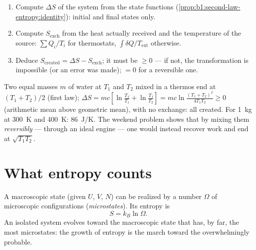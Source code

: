\begin{method}\label{met:b1:second-law-entropy:method}
\begin{enumerate}
  \item Compute $\Delta S$ of the system from the state functions
        (\cref{prop:b1:second-law-entropy:identity}): initial and final
        states only.
  \item Compute $S_{\mathrm{exch}}$ from the heat actually received and the
        temperature of the source: $\sum Q_i/T_i$ for thermostats,
        $\int\delta Q/T_{\mathrm{ext}}$ otherwise.
  \item Deduce $S_{\mathrm{created}} = \Delta S - S_{\mathrm{exch}}$; it must be
        $\geq 0$ --- if not, the transformation is impossible (or an error
        was made); $= 0$ for a reversible one.
\end{enumerate}
\end{method}

\begin{example}\label{ex:b1:second-law-entropy:mixing}
Two equal masses $m$ of water at $T_1$ and $T_2$ mixed in a thermos end at
$(T_1 + T_2)/2$ (first law); $\Delta S = mc[\ln\frac{T_f}{T_1} + \ln\frac{T_f}{T_2}]
= mc\ln\frac{(T_1 + T_2)^2}{4T_1T_2} \geq 0$ (arithmetic mean above geometric
mean), with no exchange: all created. For \qty{1}{kg} at \qty{300}{K} and
\qty{400}{K}: \qty{86}{J/K}. The weekend problem shows that by mixing them
\emph{reversibly} --- through an ideal engine --- one would instead
recover work and end at $\sqrt{T_1T_2}$.
\end{example}

\section{What entropy counts}

\begin{proposition}\label{prop:b1:second-law-entropy:boltzmann}
A macroscopic state (given $U$, $V$, $N$) can be realized by a number
$\Omega$ of microscopic configurations (\emph{microstates}). Its entropy is
\[
S = k_B\ln\Omega .
\]
An isolated system evolves toward the macroscopic state that has, by
far, the most microstates: the growth of entropy is the march toward
the overwhelmingly probable.
\end{proposition}
\admitted


